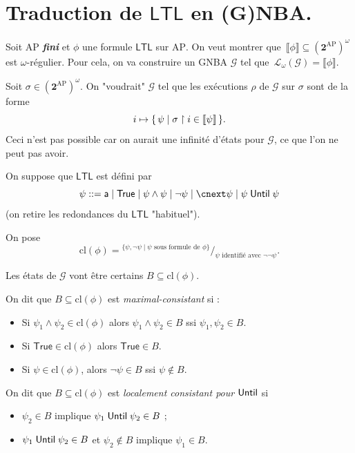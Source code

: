 \documentclass[./main]{subfiles}
\begin{document}
  \section{Traduction de $\mathsf{LTL}$ en (G)NBA.}

  Soit $\mathrm{AP}$ \textit{\textbf{fini}} et $\phi$ une formule $\mathsf{LTL}$ sur $\mathrm{AP}$.
  On veut montrer que~$\llbracket \phi\rrbracket \subseteq (\mathbf{2}^\mathrm{AP})^\omega$ est $\omega$-régulier.
  Pour cela, on va construire un GNBA $\mathcal{G}$ tel que~$\mathcal{L}_\omega(\mathcal{G}) = \llbracket \phi\rrbracket$.

  \begin{rmk}[Idée]
    Soit $\sigma \in (\mathbf{2}^\mathrm{AP})^\omega$.
    On "voudrait" $\mathcal{G}$ tel que les exécutions $\rho$ de $\mathcal{G}$ sur $\sigma$ sont de la forme 
    \[
    i \mapsto \mleft\{\, \psi \;\middle|\; \sigma \upharpoonright i \in \llbracket \psi\rrbracket \,\mright\} 
    .\]
    Ceci n'est pas possible car on aurait une infinité d'états pour $\mathcal{G}$, ce que l'on ne peut pas avoir.
  \end{rmk}

  On suppose que $\mathsf{LTL}$ est défini par 
  \[
  \psi ::= \mathsf{a}  \mid \mathsf{True}  \mid \psi \land \psi  \mid \lnot \psi  \mid \nxt \psi  \mid \psi \until \psi
  \]
  (on retire les redondances du $\mathsf{LTL}$ "habituel").

  \begin{defn}
    On pose 
    \[
      \mathrm{cl}(\phi) = {}^{\displaystyle \{\psi, \lnot \psi  \mid \psi \text{ sous formule de } \phi\}}\big/_{\displaystyle\psi \text{ identifié avec } \lnot\lnot \psi}
    .\]
  \end{defn}

  Les états de $\mathcal{G}$ vont être certains $B \subseteq \mathrm{cl}(\phi)$.

  \begin{defn}
    On dit que $B \subseteq \mathrm{cl}(\phi)$ est \textit{maximal-consistant} si :
    \begin{itemize}
      \item  Si $\psi_1 \land \psi_2 \in \mathrm{cl}(\phi)$ alors $\psi_1 \land \psi_2 \in B$ ssi $\psi_1, \psi_2 \in B$.
      \item Si $\mathsf{True} \in \mathrm{cl}(\phi)$ alors $\mathsf{True} \in B$.
      \item Si $\psi \in \mathrm{cl}(\phi)$, alors $\lnot \psi \in B$ ssi $\psi \not\in B$.
    \end{itemize}

    On dit que $B \subseteq \mathrm{cl}(\phi)$ est \textit{localement consistant pour $\mathrel{\mathsf{Until}}$} si
    \begin{itemize}
      \item $\psi_2 \in B$ implique $\psi_1 \mathrel{\mathsf{Until}} \psi_2 \in B$ ;
      \item $\psi_1 \mathrel{\mathsf{Until}} \psi_2 \in B$ et $\psi_2 \not\in  B$ implique $\psi_1 \in B$.
    \end{itemize}
  \end{defn}
\end{document}
